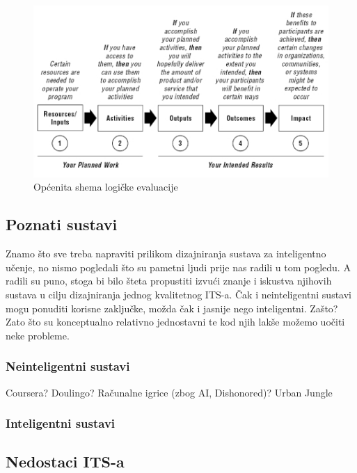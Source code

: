 \documentclass[times, utf8, zavrsni]{fer}
\begin{document}
\begin{figure}[htb]
	\centering
	\includegraphics[]{img/logic.jpg}
	\caption{Općenita shema logičke evaluacije}
	\label{fig:logic_eval}
\end{figure}

\pagebreak

\subsection{Poznati sustavi}

Znamo što sve treba napraviti prilikom dizajniranja sustava za inteligentno učenje, no nismo pogledali što su pametni ljudi prije nas radili u tom pogledu. A radili su puno, stoga bi bilo šteta propustiti izvući znanje i iskustva njihovih sustava u cilju dizajniranja jednog kvalitetnog ITS-a. Čak i neinteligentni sustavi mogu ponuditi korisne zaključke, možda čak i jasnije nego inteligentni. Zašto? Zato što su konceptualno relativno jednostavni te kod njih lakše možemo uočiti neke probleme.

\subsubsection{Neinteligentni sustavi}
Coursera? Doulingo? Računalne igrice (zbog AI, Dishonored)? Urban Jungle

\subsubsection{Inteligentni sustavi}

\subsection{Nedostaci ITS-a}
\end{document}
